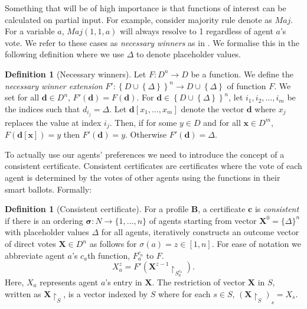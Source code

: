 \documentclass[11pt,a4paper, titlepage]{article}
\theoremstyle{definition}
\newtheorem{definition}[theorem]{Definition}
\let\vec\mathbf
\begin{document}
Something that will be of high importance is that functions of interest can be calculated on partial input.  
For example, consider majority rule denote as $\mathit{Maj}$. For a variable $a$, $\mathit{Maj}(1, 1, a)$ will always resolve to 1 regardless of agent $a$'s vote. 
We refer to these cases as \emph{necessary winners} as in \citet{konczak2005voting}.
We formalise this in the following definition where we use $\Delta$ to denote placeholder values.

\begin{definition}[Necessary winners]
    Let $F \colon D^n \longrightarrow D $ be a function.
    We define the \emph{necessary winner extension} $F' \colon \left\{D \cup \left\{\Delta\right\}\right\}^n \longrightarrow D \cup \left\{\Delta\right\}$ of function $F$. 
    We set for all $\vec{d} \in D^n$, $F'(\vec{d}) = F(\vec{d})$.
    For $\vec{d} \in \left\{D \cup \left\{\Delta\right\}\right\}^n$, let $i_1, i_2, \ldots, i_m$ be the indices such that $d_{i_j} = \Delta$.
    Let $\vec{d}[x_1, \ldots, x_m]$ denote the vector $\vec{d}$ where $x_j$ replaces the value at index $i_j$. Then, if for some $y \in D$ and for all $\vec{x} \in D^m$, $F(\vec{d}[\vec{x}]) = y$ then $F'(\vec{d}) = y$.
    Otherwise $F'(\vec{d}) = \Delta$.
\end{definition}

To actually use our agents' preferences we need to introduce the concept of a consistent certificate. 
Consistent certificates are certificates where the vote of each agent is determined by the votes of other agents using the functions in their smart ballots. Formally:

\begin{definition}[Consistent certificate]
    For a profile $\mathbf{B}$, a certificate $\mathbf{c}$ is \emph{consistent} if there is an ordering $\mathbf{\sigma} \colon N \longrightarrow \{1,\ldots, n\}$ of agents starting from vector $\vec{X}^0 = \{\Delta\}^n$ with placeholder values $\Delta$ for all agents, iteratively constructs an outcome vector of direct votes $\vec{X} \in D^n$ as follows for $\sigma(a) = z \in [1,n]$. For ease of notation we abbreviate agent $a$'s $c_a$th function, $F_a^{c_a}$ to $F$.
    \[
        X^z_a = F'(\vec{X}^{z-1} \restriction_{S^{c_a}_a} ).
    \]
    Here, $X_a$ represents agent $a$'s entry in $\vec{X}$. 
    The restriction of vector $\vec{X}$ in $S$, written as $\vec{X} \restriction_S$, is a vector indexed by $S$ where for each $s \in S$,  $(\vec{X} \restriction_S)_s = X_s$.


\end{definition}
\end{document}
